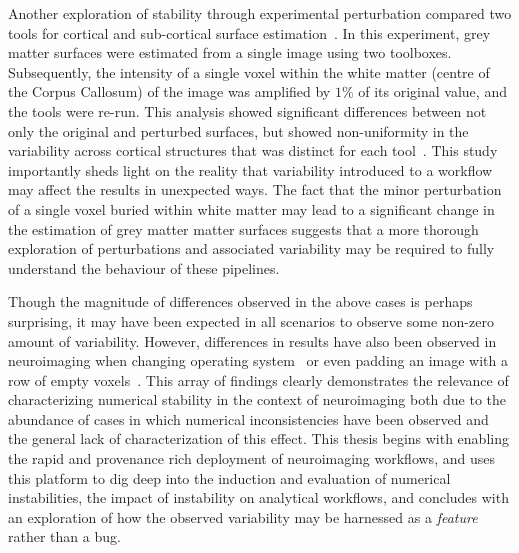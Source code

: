 Another exploration of stability through experimental perturbation compared two tools for cortical and sub-cortical
surface estimation~\cite{Lewis2017-ll}. In this experiment, grey matter surfaces were estimated from a single image using
two toolboxes. Subsequently, the intensity of a single voxel within the white matter (centre of the Corpus Callosum) of
the image was amplified by $1\%$ of its original value, and the tools were re-run. This analysis showed significant
differences between not only the original and perturbed surfaces, but showed non-uniformity in the variability across
cortical structures that was distinct for each tool~\cite{Lewis2017-ll}. This study importantly sheds light on the reality
that variability introduced to a workflow may affect the results in unexpected ways. The fact that the minor perturbation
of a single voxel buried within white matter may lead to a significant change in the estimation of grey matter matter
surfaces suggests that a more thorough exploration of perturbations and associated variability may be required to fully
understand the behaviour of these pipelines.

Though the magnitude of differences observed in the above cases is perhaps surprising, it may have been expected in all
scenarios to observe some non-zero amount of variability. However, differences in results have also been observed
in neuroimaging when changing operating system~\cite{Glatard2015-vc,salari2020file} or even padding an image with a row
of empty voxels~\cite{Glen2018-sg}. This array of findings clearly demonstrates the relevance of characterizing numerical
stability in the context of neuroimaging both due to the abundance of cases in which numerical inconsistencies have been
observed and the general lack of characterization of this effect. This thesis begins with enabling the rapid and
provenance rich deployment of neuroimaging workflows, and uses this platform to dig deep into the induction and
evaluation of numerical instabilities, the impact of instability on analytical workflows, and concludes with an
exploration of how the observed variability may be harnessed as a \textit{feature} rather than a bug.

